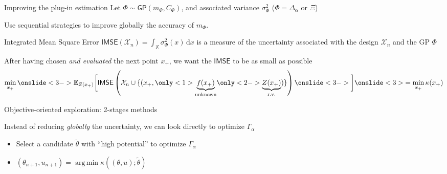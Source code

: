 \documentclass[10pt,aspectratio=169,usepdftitle=false]{beamer}
\newcommand{\Xspace}{\mathbb{X}}
\newcommand{\Ex}{\mathbb{E}}
\newcommand{\GP}{\mathsf{GP}}
\DeclareMathOperator*{\argmin}{arg\,min}
\newcommand{\kk}{\theta}
\newcommand{\uu}{u}
\begin{document}
\begin{frame}{Improving the plug-in estimation}
  Let $\Phi \sim \GP(m_\Phi, C_\Phi)$, and associated variance $\sigma^2_{\Phi}$ ($\Phi= \Delta_{\alpha}$ or $\Xi$)

  
  Use sequential strategies to improve \alert{globally} the accuracy of $m_\Phi$.
  \begin{block}{Integrated Mean Square Error}
    $\mathsf{IMSE}(\mathcal{X}_n) = \int_{\Xspace}
    \sigma^2_{\Phi}(x)\,\mathrm{d}x$ is a measure of the uncertainty
    associated with the design $\mathcal{X}_n$ and the GP $\Phi$
  \end{block}
  After having chosen \emph{and evaluated} the next point $x_{+}$, we want the $\mathsf{IMSE}$ to be as small as possible
  \begin{equation}
    \min_{x_{+}} \onslide<3->{\Ex_{Z(x_+)}\bigg[}\mathsf{IMSE}\left(\mathcal{X}_n \cup \{(x_{+}, \only<1>{\underbrace{f(x_{+})}_{\text{unknown}}} \only<2->{\underbrace{Z(x_+)}_{\text{r.v.}}})\}\right) \onslide<3->{\bigg]} \onslide<3>{= \min_{x_+} \kappa(x_{+})}
  \end{equation}
\end{frame}

\begin{frame}{Objective-oriented exploration: 2-stages methods}
  
  Instead of reducing \emph{globally} the uncertainty, we can look directly to optimize $\Gamma_{\alpha}$
  \begin{itemize}
  \item Select a candidate $\tilde{\kk}$ with ``high potential'' to optimize $\Gamma_{\alpha}$ 
  \item $(\kk_{n+1},\uu_{n+1}) = \argmin \kappa((\kk, \uu); \tilde{\kk})$
  \end{itemize}
\end{frame}
\end{document}
